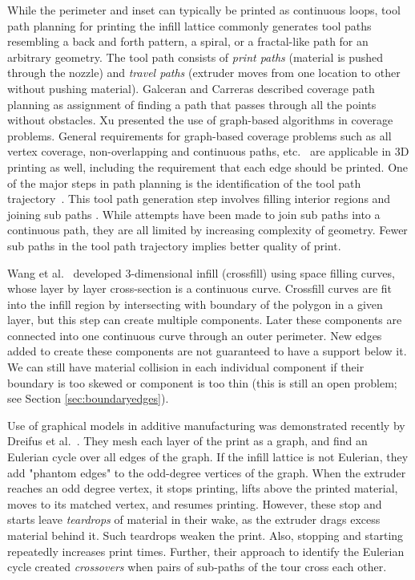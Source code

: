 While the perimeter and inset can typically be printed as continuous loops, tool path planning for printing the infill lattice commonly generates tool paths resembling a back and forth pattern, a spiral, or a fractal-like path for an arbitrary geometry.
The tool path consists of \textit{print paths} (material is pushed through the nozzle) and \textit{travel paths} (extruder moves from one location to other without pushing material).
Galceran and Carreras \cite{GaCa2013} described coverage path planning as assignment of finding a path that passes through all the points without obstacles.
Xu \cite{Xu2011} presented the use of graph-based algorithms in coverage problems.
General requirements for graph-based coverage problems such as all vertex coverage, non-overlapping and continuous paths, etc.~\cite{CaHuHa1988} are applicable in 3D printing as well, including the requirement that each edge should be printed.
One of the major steps in path planning is the identification of the tool path trajectory~\cite{DiPaCuLi2015}.
This tool path generation step involves filling interior regions and joining sub paths \cite{JiHeDu2017}.
While attempts have been made to join sub paths into a continuous path, they are all limited by increasing complexity of geometry.
Fewer sub paths in the tool path trajectory implies better quality of print.

Wang et al.~\cite{KuWuWa2019} developed $3$-dimensional infill (crossfill) using space filling curves, whose layer by layer cross-section is a continuous curve.
Crossfill curves are fit into the infill region by intersecting with boundary of the polygon in a given layer, but this step can create multiple components.
Later these components are connected into one continuous curve through an outer perimeter.
New edges added to create these components are not guaranteed to have a support below it.
We can still have material collision in each individual component if their boundary is too skewed or component is too thin (this is still an open problem; see Section \ref{sec:boundaryedges}). 
 
Use of graphical models in additive manufacturing was demonstrated recently by Dreifus et al.~\cite{Dretal2017}.
They mesh each layer of the print as a graph, and find an Eulerian cycle over all edges of the graph.
If the infill lattice is not Eulerian, they add "phantom edges" to the odd-degree vertices of the graph.
When the extruder reaches an odd degree vertex, it stops printing, lifts above the printed material, moves to its matched vertex, and resumes printing.
However, these stop and starts leave \textit{teardrops} of material in their wake, as the extruder drags excess material behind it.
Such teardrops weaken the print.
Also, stopping and starting repeatedly increases print times.
Further, their approach to identify the Eulerian cycle created \emph{crossovers} when pairs of sub-paths of the tour cross each other.

